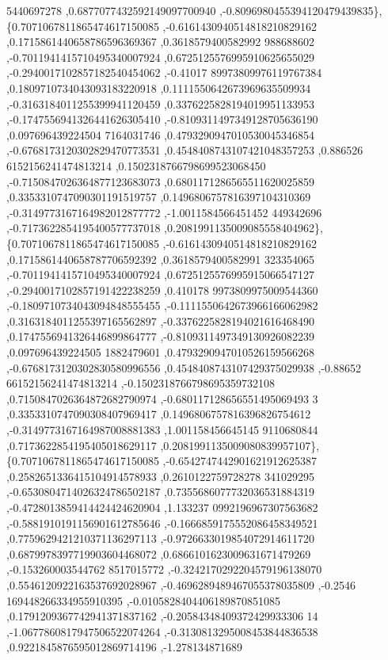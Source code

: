 \begin{DoxyCode}
      5440697278 ,0.6877077432592149097700940 ,-0.8096980455394120479439835\},
\{0.7071067811865474617150085 ,-0.6161430940514818210829162 ,0.1715861440658786596369367 ,0.3618579400582992
      988688602 ,-0.7011941415710495340007924 ,0.6725125576995910625655029 ,-0.2940017102857182540454062 ,-0.41017
      89973809976119767384 ,0.1809710734043093183220918 ,0.1111550642673969635509934 ,-0.3163184011255399941120459
       ,0.3376225828194019951133953 ,-0.1747556941326441626305410 ,-0.8109311497349128705636190 ,0.097696439224504
      7164031746 ,0.4793290947010530045346854 ,-0.6768173120302829470773531 ,0.4548408743107421048357253 ,0.886526
      6152156241474813214 ,0.1502318766798699523068450 ,-0.7150847026364877123683073 ,0.6801171286565511620025859 
      ,0.3353310747090301191519757 ,0.1496806757816397104310369 ,-0.3149773167164982012877772 ,-1.0011584566451452
      449342696 ,-0.7173622854195400577737018 ,0.2081991135009085558404962\},
\{0.7071067811865474617150085 ,-0.6161430940514818210829162 ,0.1715861440658787706592392 ,0.3618579400582991
      323354065 ,-0.7011941415710495340007924 ,0.6725125576995915066547127 ,-0.2940017102857191422238259 ,0.410178
      9973809975009544360 ,-0.1809710734043094848555455 ,-0.1111550642673966166062982 ,0.3163184011255397165562897
       ,-0.3376225828194021616468490 ,0.1747556941326446899864777 ,-0.8109311497349130926082239 ,0.097696439224505
      1882479601 ,0.4793290947010526159566268 ,-0.6768173120302830580996556 ,0.4548408743107429375029938 ,-0.88652
      66152156241474813214 ,-0.1502318766798695359732108 ,0.7150847026364872682790974 ,-0.680117128656551495069493
      3 ,0.3353310747090308407969417 ,0.1496806757816396826754612 ,-0.3149773167164987008881383 ,1.001158456645145
      9110680844 ,0.7173622854195405018629117 ,0.2081991135009080839957107\},
\{0.7071067811865474617150085 ,-0.6542747442901621912625387 ,0.2582651336415104914578933 ,0.2610122759728278
      341029295 ,-0.6530804714026324786502187 ,0.7355686077732036531884319 ,-0.4728013859414424424620904 ,1.133237
      0992196967307563682 ,-0.5881910191156901612785646 ,-0.1666859175552086458349521 ,0.7759629421210371136297113
       ,-0.9726633019854072914611720 ,0.6879978397719903604468072 ,0.6866101623009631671479269 ,-0.153260003544762
      8517015772 ,-0.3242170292204579196138070 ,0.5546120922163537692028967 ,-0.4696289489467055378035809 ,-0.2546
      169448266334955910395 ,-0.0105828404406189870851085 ,0.1791209367742941371837162 ,-0.20584348409372429933306
      14 ,-1.0677860817947506522074264 ,-0.3130813295008453844836538 ,0.9221845876595012869714196 ,-1.278134871689

\end{DoxyCode}
